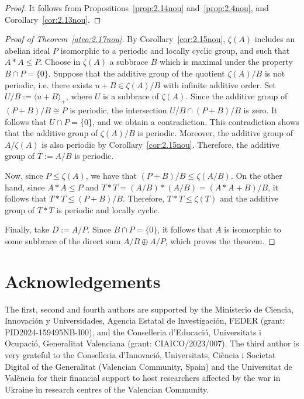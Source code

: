 \documentclass[12pt, a4paper, english]{article}
\theoremstyle{definition}
\begin{document}
\begin{proof}
It follows from Propositions~\ref{prop:2.14nou} and~\ref{prop:2.4nou}, and Corollary~\ref{cor:2.13nou}.
\end{proof}


\begin{proof}[Proof of Theorem~\ref{ateo:2.17nou}]
By Corollary~\ref{cor:2.15nou}, $\zeta(A)$ includes an abelian ideal $P$ isomorphic to a periodic and locally cyclic group, and such that $A \ast A \leq P$. Choose in $\zeta(A)$ a subbrace $B$ which is maximal under the property $B \cap P  = \{0\}$. Suppose that the additive group of the quotient $\zeta(A)/B$ is not periodic, i.e. there exists $u +B \in \zeta(A)/B$ with infinite additive order. Set $U/B:= \langle u + B \rangle_+$, where $U$ is a subbrace of $\zeta(A)$. Since the additive group of $(P + B)/B \cong P$ is periodic, the intersection $U/B \cap (P + B)/B$ is zero. It follows that $U \cap P = \{0\}$, and we obtain a contradiction. This contradiction shows that the additive group of $\zeta(A)/B$ is periodic. Moreover, the additive group of $A/\zeta(A)$ is also periodic by Corollary~\ref{cor:2.15nou}. Therefore, the additive group of $T := A/B$ is periodic. 

Now, since $P \leq \zeta(A)$, we have that $(P + B)/B \leq \zeta(A/B)$. On the other hand, since $A \ast A\leq  P$ and $T \ast T = (A/B) \ast (A/B) = (A \ast A + B)/B$, it follows that $T \ast T \leq (P+B)/B$. Therefore, $T \ast T \leq \zeta(T)$ and the additive group of $T \ast T$ is periodic and locally cyclic. 

Finally, take $D := A/P$. Since $B \cap P = \{0\}$, it follows that $A$ is isomorphic to some subbrace of the direct sum $A/B \oplus A/P$, which proves the theorem.
\end{proof}


\section*{Acknowledgements}
The first, second and fourth authors are supported by the Ministerio de Ciencia, Innovación y Universidades, Agencia Estatal de Investigación, FEDER (grant: PID2024-159495NB-I00), and the Conselleria d'Educació, Universitats i Ocupació, Generalitat Valenciana (grant: \mbox{CIAICO/2023/007}). The third author is very grateful to the Conselleria d'Innovaci\'o, Universitats, Ci\`encia i
Societat Digital of the Generalitat (Valencian Community, Spain) and the Universitat de
Val\`encia for their financial support to host researchers affected by the war in
Ukraine in research centres of the Valencian Community. 
\end{document}

